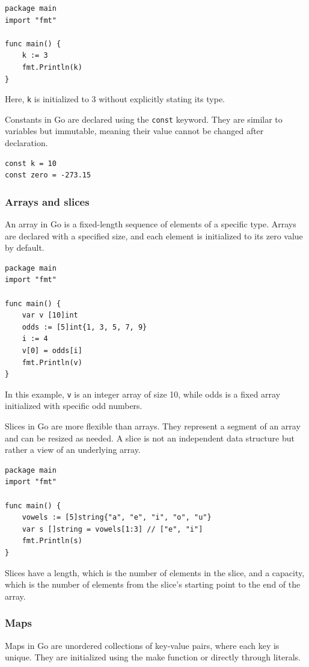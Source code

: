 \begin{verbatim}
package main
import "fmt"

func main() {
    k := 3
    fmt.Println(k)
}
\end{verbatim}
Here, \texttt{k} is initialized to 3 without explicitly stating its type.

Constants in Go are declared using the \texttt{const} keyword. They are similar to variables but immutable, meaning their value cannot be changed after declaration.

\begin{verbatim}
const k = 10
const zero = -273.15
\end{verbatim}

\subsubsection{Arrays and slices}
An array in Go is a fixed-length sequence of elements of a specific type. Arrays are declared with a specified size, and each element is initialized to its zero value by default.

\begin{verbatim}
package main
import "fmt"

func main() {
    var v [10]int
    odds := [5]int{1, 3, 5, 7, 9}
    i := 4
    v[0] = odds[i]
    fmt.Println(v)
}
\end{verbatim}
In this example, \texttt{v} is an integer array of size 10, while odds is a fixed array initialized with specific odd numbers.

Slices in Go are more flexible than arrays. They represent a segment of an array and can be resized as needed. A slice is not an independent data structure but rather a view of an underlying array.

\begin{verbatim}
package main
import "fmt"

func main() {
    vowels := [5]string{"a", "e", "i", "o", "u"}
    var s []string = vowels[1:3] // ["e", "i"]
    fmt.Println(s)
}
\end{verbatim}
Slices have a length, which is the number of elements in the slice, and a capacity, which is the number of elements from the slice's starting point to the end of the array.

\subsubsection{Maps}
Maps in Go are unordered collections of key-value pairs, where each key is unique. They are initialized using the make function or directly through literals.

